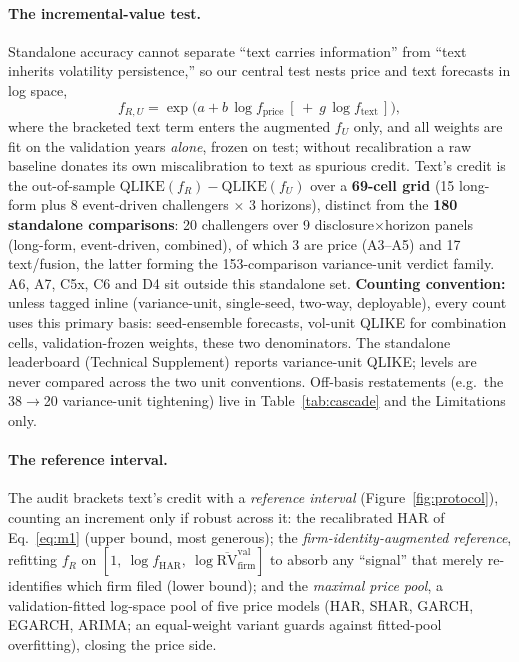 \paragraph{The incremental-value test.}
Standalone accuracy cannot separate ``text carries information'' from ``text inherits volatility persistence,'' so our central test nests price and text forecasts in log space,
\begin{equation}
f_{R,U} = \exp\!\bigl(a + b\,\log f_{\text{price}}\ [\,{+}\ g\,\log f_{\text{text}}\,]\bigr),
\label{eq:m1}
\end{equation}
where the bracketed text term enters the augmented $f_U$ only, and all weights are fit on the validation years \emph{alone}, frozen on test; without recalibration a raw baseline donates its own miscalibration to text as spurious credit. Text's credit is the out-of-sample $\mathrm{QLIKE}(f_R)-\mathrm{QLIKE}(f_U)$ over a \textbf{69-cell grid} (15 long-form plus 8 event-driven challengers $\times$ 3 horizons), distinct from the \textbf{180 standalone comparisons}: 20 challengers over 9 disclosure$\times$horizon panels (long-form, event-driven, combined), of which 3 are price (A3--A5) and 17 text/fusion, the latter forming the 153-comparison variance-unit verdict family. A6, A7, C5x, C6 and D4 sit outside this standalone set. \textbf{Counting convention:} unless tagged inline (variance-unit, single-seed, two-way, deployable), every count uses this primary basis: seed-ensemble forecasts, vol-unit QLIKE for combination cells, validation-frozen weights, these two denominators. The standalone leaderboard (Technical Supplement) reports variance-unit QLIKE; levels are never compared across the two unit conventions. Off-basis restatements (e.g.\ the 38$\to$20 variance-unit tightening) live in Table~\ref{tab:cascade} and the Limitations only.

\paragraph{The reference interval.}
The audit brackets text's credit with a \emph{reference interval} (Figure~\ref{fig:protocol}), counting an increment only if robust across it: the recalibrated HAR of Eq.~\eqref{eq:m1} (upper bound, most generous); the \emph{firm-identity-augmented reference}, refitting $f_R$ on $[1,\ \log f_{\text{HAR}},\ \log \overline{\mathrm{RV}}^{\text{val}}_{\text{firm}}]$ to absorb any ``signal'' that merely re-identifies which firm filed (lower bound); and the \emph{maximal price pool}, a validation-fitted log-space pool of five price models (HAR, SHAR, GARCH, EGARCH, ARIMA; an equal-weight variant guards against fitted-pool overfitting), closing the price side.

